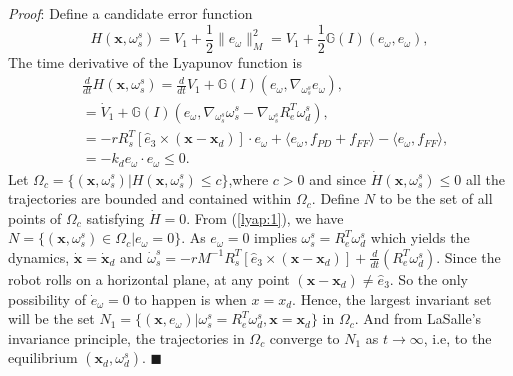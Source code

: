 \documentclass{ifacconf}
\begin{document}
\textit{Proof}: Define a candidate error function
\begin{equation}
H(\mathbf{x},\omega_{s}^{s}) = V_{1} + \frac{1}{2}\| e_{\omega}\|_{M}^{2} = V_{1} + \frac{1}{2}\mathbb{G}(I)(e_{\omega},e_{\omega}),
\end{equation}
The time derivative of the Lyapunov function is
\begin{align}
& \frac{d}{dt}H(\mathbf{x},\omega_{s}^{s}) = \frac{d}{dt}V_{1} + \mathbb{G}(I)(e_{\omega},\nabla_{\omega_{s}^{s}}e_{\omega}), \nonumber \\
& = \dot{V}_{1} + \mathbb{G}(I)(e_{\omega},\nabla_{\omega_{s}^{s}}\omega_{s}^{s} - \nabla_{\omega_{s}^{s}}R_{e}^{T} \omega_{d}^{s}), \nonumber \\
& = - r R_{s}^{T} [\hat{e}_{3} \times (\mathbf{x} - \mathbf{x}_{d})]\cdot e_{\omega} + \langle e_{\omega}, f_{PD} + f_{FF}  \rangle - \langle e_{\omega}, f_{FF}\rangle, \nonumber \\
& = - k_{d} e_{\omega}\cdot e_{\omega} \leq 0. \label{lyap:1}
\end{align}
Let $\Omega_{c} = \{ (\mathbf{x}, \omega_{s}^{s}) | H(\mathbf{x},\omega_{s}^{s}) \leq c \}$,where $c>0$ and since $\dot{H}(\mathbf{x},\omega_{s}^{s}) \leq 0$ all the trajectories are bounded and contained within $\Omega_{c}$. Define $N$ to be the set of all points  of $\Omega_{c}$ satisfying $\dot{H}=0$. From (\ref{lyap:1}), we have $N = \{(\mathbf{x},\omega_{s}^{s})\in \Omega_{c} | e_{\omega}=0 \}$. As $e_{\omega}=0$ implies $\omega_{s}^{s} = R_{e}^{T}\omega_{d}^{s}$ which yields the dynamics, $\dot{\mathbf{x}} = \dot{\mathbf{x}}_{d}$ and $\dot{\omega}_{s}^{s} = - r M^{-1}R_{s}^{T}[\hat{e}_{3} \times (\mathbf{x} - \mathbf{x}_{d})] + \frac{d}{dt}(R_{e}^{T}\omega_{d}^{s})$. Since the robot rolls on a horizontal plane, at any point $(\mathbf{x} - \mathbf{x}_{d}) \neq \hat{e}_{3}$. So the only possibility of $\dot{e}_{\omega} = 0$ to happen is when $x = x_{d}$. Hence, the largest invariant set will be the set $N_{1} = \{(\mathbf{x}, e_{\omega})| \omega_{s}^{s}=R_{e}^{T}\omega_{d}^{s}, \mathbf{x}=\mathbf{x}_{d}\}$ in $\Omega_{c}$. And from LaSalle's invariance principle, the trajectories in $\Omega_{c}$ converge to $N_{1}$ as $t \rightarrow \infty $, i.e, to the equilibrium $(\mathbf{x}_{d},\omega_{d}^{s})$. $\blacksquare$
\end{document}
